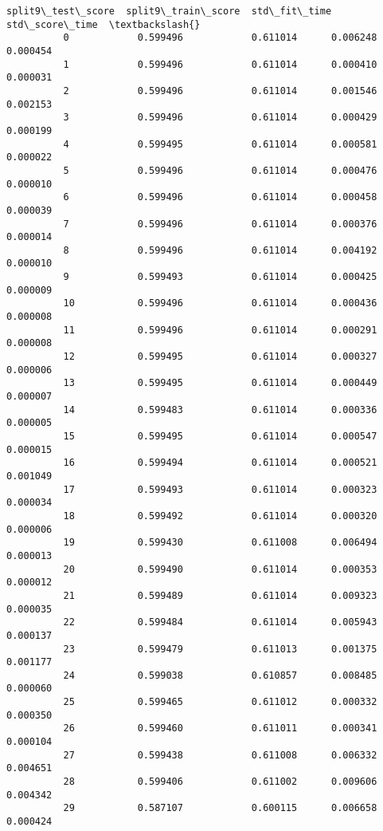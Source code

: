 \documentclass[11pt]{article}
\begin{document}
\begin{Verbatim}[commandchars=\\\{\}]
              split9\_test\_score  split9\_train\_score  std\_fit\_time  std\_score\_time  \textbackslash{}
          0            0.599496            0.611014      0.006248        0.000454   
          1            0.599496            0.611014      0.000410        0.000031   
          2            0.599496            0.611014      0.001546        0.002153   
          3            0.599496            0.611014      0.000429        0.000199   
          4            0.599495            0.611014      0.000581        0.000022   
          5            0.599496            0.611014      0.000476        0.000010   
          6            0.599496            0.611014      0.000458        0.000039   
          7            0.599496            0.611014      0.000376        0.000014   
          8            0.599496            0.611014      0.004192        0.000010   
          9            0.599493            0.611014      0.000425        0.000009   
          10           0.599496            0.611014      0.000436        0.000008   
          11           0.599496            0.611014      0.000291        0.000008   
          12           0.599495            0.611014      0.000327        0.000006   
          13           0.599495            0.611014      0.000449        0.000007   
          14           0.599483            0.611014      0.000336        0.000005   
          15           0.599495            0.611014      0.000547        0.000015   
          16           0.599494            0.611014      0.000521        0.001049   
          17           0.599493            0.611014      0.000323        0.000034   
          18           0.599492            0.611014      0.000320        0.000006   
          19           0.599430            0.611008      0.006494        0.000013   
          20           0.599490            0.611014      0.000353        0.000012   
          21           0.599489            0.611014      0.009323        0.000035   
          22           0.599484            0.611014      0.005943        0.000137   
          23           0.599479            0.611013      0.001375        0.001177   
          24           0.599038            0.610857      0.008485        0.000060   
          25           0.599465            0.611012      0.000332        0.000350   
          26           0.599460            0.611011      0.000341        0.000104   
          27           0.599438            0.611008      0.006332        0.004651   
          28           0.599406            0.611002      0.009606        0.004342   
          29           0.587107            0.600115      0.006658        0.000424   

\end{Verbatim}
\end{document}
